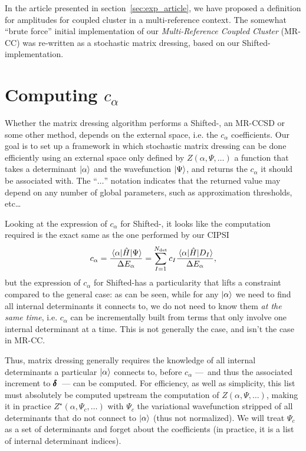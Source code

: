 \documentclass[./thesis.tex]{subfiles}
\begin{document}
In the article presented in section~\ref{sec:exp_article}, we have proposed a definition for amplitudes for coupled cluster in a multi-reference context. The somewhat ``brute force'' initial implementation of our \emph{Multi-Reference Coupled Cluster} (MR-CC) was re-written as a stochastic matrix dressing, based on our Shifted-\Bk implementation.

\section{Computing $c_\alpha$}
Whether the matrix dressing algorithm performs a Shifted-\Bk, an MR-CCSD or some other method, depends on the external space, i.e. the $c_\alpha$ coefficients. Our goal is to set up a framework in which stochastic matrix dressing can be done efficiently using an external space only defined by $Z(\alpha, \Psi, \ldots)$ a function that takes a determinant ${\ket{\alpha}}$ and the wavefunction $\ket \Psi$, and returns the $c_\alpha$ it should be associated with. The ``$\ldots$'' notation indicates that the returned value may depend on any number of global parameters, such as approximation thresholds, etc\dots

Looking at the expression of $c_\alpha$ for Shifted-\Bk, it looks like the computation required is the exact same as the one performed by our CIPSI
\begin{equation}
c_\alpha = \frac{\mel{\alpha}{\hat{H}}{\Psi}}{\Delta E_\alpha} = \sum_{I=1}^{{N_\text{det}}} c_I \frac{\mel{\alpha}{\hat{H}}{D_I}}{\Delta E_\alpha},
\end{equation}
but the expression of $c_\alpha$ for Shifted-\Bk has a particularity that lifts a constraint compared to the general case: as can be seen, while for any ${\ket{\alpha}}$ we need to find all internal determinants it connects to, we do not need to know them \emph{at the same time}, i.e. $c_\alpha$ can be incrementally built from terms that only involve one internal determinant at a time. This is not generally the case, and isn't the case in MR-CC.

Thus, matrix dressing generally requires the knowledge of all internal determinants a particular ${\ket{\alpha}}$ connects to, before $c_\alpha$ ---~and thus the associated increment to $\pmb \delta$~--- can be computed. For efficiency, as well as simplicity, this list must absolutely be computed upstream the computation of $Z(\alpha, \Psi, \ldots)$, making it in practice $Z^\star(\alpha, \Psi_{c}, \ldots)$ with $\Psi_{c}$ the variational wavefunction stripped of all determinants that do not connect to ${\ket{\alpha}}$ (thus not normalized). We will treat $\Psi_{c}$ as a set of determinants and forget about the coefficients (in practice, it is a list of internal determinant indices).
\end{document}
